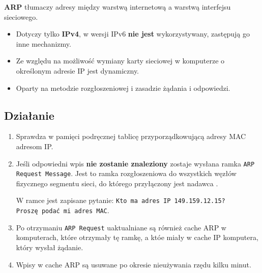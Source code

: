 \documentclass[../sk-egzamin.tex]{subfiles}
\begin{document}

\textbf{ARP } tłumaczy adresy między
warstwą internetową a warstwą interfejsu sieciowego.

\begin{itemize}
    \item Dotyczy tylko \textbf{IPv4}, w wersji IPv6 \textbf{nie jest}
    wykorzystywany, zastępują go inne mechanizmy.

    \item Ze względu na możliwość wymiany karty sieciowej w komputerze o
    określonym adresie IP jest dynamiczny.

    \item Oparty na metodzie rozgłoszeniowej i zasadzie żądania i odpowiedzi.
\end{itemize}

\subsection*{Działanie}
\begin{enumerate}
    \item Sprawdza w pamięci podręcznej tablicę przyporządkowującą adresy
    MAC adresom IP.

    \item Jeśli odpowiedni wpis \textbf{nie zostanie znaleziony} zostaje
    wysłana ramka \texttt{ARP Request Message}.
    Jest to ramka rozgłoszeniowa do wszystkich węzłów fizycznego segmentu sieci,
    do którego przyłączony jest nadawca .

    W ramce jest zapisane pytanie:
    \texttt{Kto ma adres IP 149.159.12.15?}\\
    \texttt{Proszę podać mi adres MAC}.

    \item Po otrzymaniu \texttt{ARP Request} uaktualniane są również cache ARP
    w komputerach, które otrzymały tę ramkę, a któe miały w cache IP komputera,
    który wysłał żądanie.

    \item Wpisy w cache ARP są usuwane po okresie nieużywania rzędu kilku minut.
\end{enumerate}
\end{document}
